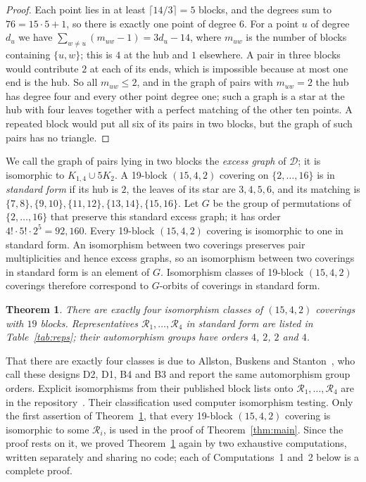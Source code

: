 \documentclass[11pt]{amsart}
\newtheorem{theorem}{Theorem}[section]
\theoremstyle{definition}
\theoremstyle{remark}
\newcommand{\cD}{\mathcal{D}}
\newcommand{\cR}{\mathcal{R}}
\begin{document}
\begin{proof}
Each point lies in at least $\lceil 14/3\rceil=5$ blocks, and the degrees sum
to $76=15\cdot 5+1$, so there is exactly one point of degree $6$. For a point
$u$ of degree $d_u$ we have $\sum_{w\ne u}(m_{uw}-1)=3d_u-14$, where $m_{uw}$
is the number of blocks containing $\{u,w\}$; this is $4$ at the hub and $1$
elsewhere. A pair in three blocks would contribute $2$ at each of its ends,
which is impossible because at most one end is the hub. So all $m_{uw}\le 2$,
and in the graph of pairs with $m_{uw}=2$ the hub has degree four and every
other point degree one; such a graph is a star at the hub with four leaves
together with a perfect matching of the other ten points. A repeated block would put
all six of its pairs in two blocks, but the graph of such pairs has no
triangle.
\end{proof}

We call the graph of pairs lying in two blocks the \emph{excess graph} of
$\cD$; it is isomorphic to $K_{1,4}\cup 5K_2$. A 19-block $(15,4,2)$
covering on $\{2,\dots,16\}$ is in \emph{standard form} if its hub is $2$, the
leaves of its star are $3,4,5,6$, and its matching is
$\{7,8\},\{9,10\},\{11,12\},\{13,14\},\{15,16\}$. Let $G$ be the group of
permutations of $\{2,\dots,16\}$ that preserve this standard excess graph; it
has order $4!\cdot 5!\cdot 2^5=92{,}160$. Every 19-block
$(15,4,2)$ covering is isomorphic to one in standard form. An isomorphism
between two coverings preserves pair multiplicities and hence excess graphs,
so an isomorphism between two coverings in standard form is an element of $G$.
Isomorphism classes of 19-block $(15,4,2)$ coverings therefore correspond to
$G$-orbits of coverings in standard form.

\begin{theorem}\label{thm:classification}
There are exactly four isomorphism classes of $(15,4,2)$ coverings with $19$
blocks. Representatives $\cR_1,\dots,\cR_4$ in standard form are listed in
Table~\ref{tab:reps}; their automorphism groups have orders $4$, $2$, $2$
and $4$.
\end{theorem}

That there are exactly four classes is due to Allston, Buskens and
Stanton~\cite[Theorem~12]{allston1988}, who call these designs D2, D1, B4 and
B3 and report the same automorphism group orders. Explicit isomorphisms from
their published block lists onto $\cR_1,\dots,\cR_4$ are in the
repository~\cite{covering64repo}. Their classification used computer
isomorphism testing. Only the first assertion of
Theorem~\ref{thm:classification}, that every 19-block $(15,4,2)$ covering is
isomorphic to some $\cR_i$, is used in the proof of Theorem~\ref{thm:main}.
Since the proof rests on it, we proved Theorem~\ref{thm:classification} again
by two exhaustive computations, written separately and sharing no code; each
of Computations~1 and~2 below is a complete proof.
\end{document}
